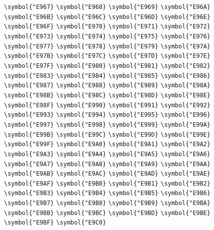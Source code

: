 \documentclass{ctexbook}
\begin{document}
 \verb|\symbol{"E967}|  \verb|\symbol{"E968}|  \verb|\symbol{"E969}|  \verb|\symbol{"E96A}|  \verb|\symbol{"E96B}|  \verb|\symbol{"E96C}|  \verb|\symbol{"E96D}|  \verb|\symbol{"E96E}|  \verb|\symbol{"E96F}|  \verb|\symbol{"E970}|  \verb|\symbol{"E971}|  \verb|\symbol{"E972}|  \verb|\symbol{"E973}|  \verb|\symbol{"E974}|  \verb|\symbol{"E975}|  \verb|\symbol{"E976}|  \verb|\symbol{"E977}|  \verb|\symbol{"E978}|  \verb|\symbol{"E979}|  \verb|\symbol{"E97A}|  \verb|\symbol{"E97B}|  \verb|\symbol{"E97C}|  \verb|\symbol{"E97D}|  \verb|\symbol{"E97E}|  \verb|\symbol{"E97F}|  \verb|\symbol{"E980}|  \verb|\symbol{"E981}|  \verb|\symbol{"E982}|  \verb|\symbol{"E983}|  \verb|\symbol{"E984}|  \verb|\symbol{"E985}|  \verb|\symbol{"E986}|  \verb|\symbol{"E987}|  \verb|\symbol{"E988}|  \verb|\symbol{"E989}|  \verb|\symbol{"E98A}|  \verb|\symbol{"E98B}|  \verb|\symbol{"E98C}|  \verb|\symbol{"E98D}|  \verb|\symbol{"E98E}|  \verb|\symbol{"E98F}|  \verb|\symbol{"E990}|  \verb|\symbol{"E991}|  \verb|\symbol{"E992}|  \verb|\symbol{"E993}|  \verb|\symbol{"E994}|  \verb|\symbol{"E995}|  \verb|\symbol{"E996}|  \verb|\symbol{"E997}|  \verb|\symbol{"E998}|  \verb|\symbol{"E999}|  \verb|\symbol{"E99A}|  \verb|\symbol{"E99B}|  \verb|\symbol{"E99C}|  \verb|\symbol{"E99D}|  \verb|\symbol{"E99E}|  \verb|\symbol{"E99F}|  \verb|\symbol{"E9A0}|  \verb|\symbol{"E9A1}|  \verb|\symbol{"E9A2}|  \verb|\symbol{"E9A3}|  \verb|\symbol{"E9A4}|  \verb|\symbol{"E9A5}|  \verb|\symbol{"E9A6}|  \verb|\symbol{"E9A7}|  \verb|\symbol{"E9A8}|  \verb|\symbol{"E9A9}|  \verb|\symbol{"E9AA}|  \verb|\symbol{"E9AB}|  \verb|\symbol{"E9AC}|  \verb|\symbol{"E9AD}|  \verb|\symbol{"E9AE}|  \verb|\symbol{"E9AF}|  \verb|\symbol{"E9B0}|  \verb|\symbol{"E9B1}|  \verb|\symbol{"E9B2}|  \verb|\symbol{"E9B3}|  \verb|\symbol{"E9B4}|  \verb|\symbol{"E9B5}|  \verb|\symbol{"E9B6}|  \verb|\symbol{"E9B7}|  \verb|\symbol{"E9B8}|  \verb|\symbol{"E9B9}|  \verb|\symbol{"E9BA}|  \verb|\symbol{"E9BB}|  \verb|\symbol{"E9BC}|  \verb|\symbol{"E9BD}|  \verb|\symbol{"E9BE}|  \verb|\symbol{"E9BF}|  \verb|\symbol{"E9C0}| 
\end{document}
